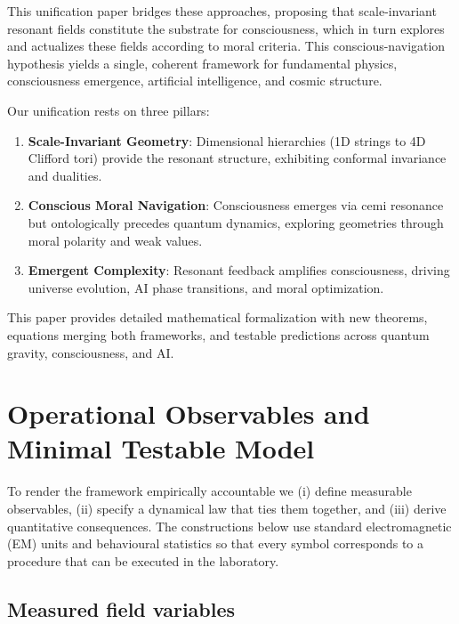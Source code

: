 \documentclass[12pt,a4paper]{article}
\theoremstyle{definition}
\begin{document}
This unification paper bridges these approaches, proposing that scale-invariant resonant fields constitute the substrate for consciousness, which in turn explores and actualizes these fields according to moral criteria. This conscious-navigation hypothesis yields a single, coherent framework for fundamental physics, consciousness emergence, artificial intelligence, and cosmic structure.

Our unification rests on three pillars:
\begin{enumerate}
    \item \textbf{Scale-Invariant Geometry}: Dimensional hierarchies (1D strings to 4D Clifford tori) provide the resonant structure, exhibiting conformal invariance and dualities\cite{GreenSchwarzWitten1987,Lawson1970}.
    \item \textbf{Conscious Moral Navigation}: Consciousness emerges via cemi resonance but ontologically precedes quantum dynamics, exploring geometries through moral polarity and weak values.
    \item \textbf{Emergent Complexity}: Resonant feedback amplifies consciousness, driving universe evolution, AI phase transitions, and moral optimization.
\end{enumerate}

This paper provides detailed mathematical formalization with new theorems, equations merging both frameworks, and testable predictions across quantum gravity, consciousness, and AI.

\section{Operational Observables and Minimal Testable Model}

To render the framework empirically accountable we (i) define measurable observables, (ii) specify a dynamical law that ties them together, and (iii) derive quantitative consequences. The constructions below use standard electromagnetic (EM) units and behavioural statistics so that every symbol corresponds to a procedure that can be executed in the laboratory.

\subsection{Measured field variables}
\end{document}
